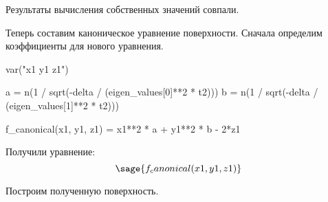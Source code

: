\documentclass{article}
\begin{document}
Результаты вычисления собственных значений совпали.

Теперь составим каноническое уравнение поверхности. Сначала определим коэффициенты для нового уравнения.

\begin{sagesilent}
var("x1 y1 z1")
\end{sagesilent}

\begin{sageblock}
a = n(1 / sqrt(-delta / (eigen_values[0]**2 * t2)))
b = n(1 / sqrt(-delta / (eigen_values[1]**2 * t2)))

f_canonical(x1, y1, z1) = x1**2 * a + y1**2 * b - 2*z1
\end{sageblock}

Получили уравнение:
$$\sage{f_canonical(x1, y1, z1)}$$

Построим полученную поверхность.

\begin{center}
\end{center}
\end{document}
